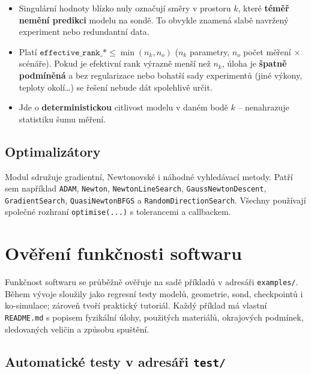 \documentclass[a4paper,11pt]{article}
\begin{document}
\begin{itemize}
  \item Singulární hodnoty blízko nuly označují směry v prostoru \(k\), které
        \textbf{téměř nemění predikci} modelu na sondě. To obvykle znamená
        slabě navržený experiment nebo redundantní data.
  \item Platí \(\texttt{effective\_rank\_*} \le \min(n_k, n_o)\) (\(n_k\)
        parametry, \(n_o\) počet měření \(\times\) scénáře). Pokud je
        efektivní rank výrazně menší než \(n_k\), úloha je \textbf{špatně
        podmíněná} a bez regularizace nebo bohatší sady experimentů (jiné
        výkony, teploty okolí\dots) se řešení nebude dát spolehlivě určit.
  \item Jde o \textbf{deterministickou} citlivost modelu v daném bodě \(k\)
        -- nenahrazuje statistiku šumu měření.
\end{itemize}

\subsection*{Optimalizátory}

Modul  sdružuje gradientní,
Newtonovské i náhodné vyhledávací metody. Patří sem například
\texttt{ADAM}, \texttt{Newton}, \texttt{NewtonLineSearch},
\texttt{GaussNewtonDescent}, \texttt{GradientSearch}, \texttt{QuasiNewtonBFGS}
a \texttt{RandomDirectionSearch}. Všechny používají společné rozhraní
\texttt{optimise(...)} s tolerancemi a callbackem.

\section{Ověření funkčnosti softwaru}\label{sec:overeni}

Funkčnost softwaru se průběžně ověřuje na sadě příkladů v adresáři
\texttt{examples/}. Během vývoje sloužily jako regresní testy modelů, geometrie,
sond, checkpointů i ko-simulace; zároveň tvoří praktický tutoriál. Každý příklad
má vlastní \texttt{README.md} s popisem fyzikální úlohy, použitých materiálů,
okrajových podmínek, sledovaných veličin a způsobu spuštění.

\subsection*{Automatické testy v adresáři \texttt{test/}}
\end{document}
